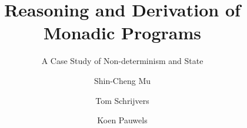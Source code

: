 \documentclass{llncs}
\begin{document}
\title{Reasoning and Derivation of Monadic Programs}
\subtitle{A Case Study of Non-determinism and State}



\author{Shin-Cheng Mu  \and Tom Schrijvers  \and Koen Pauwels }

\end{document}

